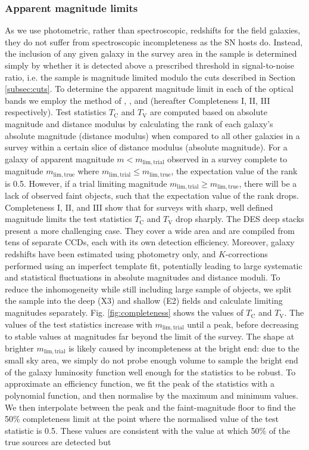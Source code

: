 \documentclass[fleqn,usenatbib]{mnras}
\begin{document}
\subsubsection{Apparent magnitude limits \label{subsubsec:mag_lims}}
As we use photometric, rather than spectroscopic, redshifts for the field galaxies, they do not suffer from spectroscopic incompleteness as the SN hosts do. Instead, the inclusion of any given galaxy in the survey area in the sample is determined simply by whether it is detected above a prescribed threshold in signal-to-noise ratio, i.e. the sample is magnitude limited modulo the cuts described in Section \ref{subsec:cuts}. To determine the apparent magnitude limit in each of the optical bands we employ the method of \citet{Johnston2007}, \citet{Teodoro2010}, and \citet{Johnston2012} (hereafter Completeness I, II, III respectively). Test statistics $T_{\mathrm{C}}$ and $T_{\mathrm{V}}$ are computed based on absolute magnitude and distance modulus by calculating the rank of each galaxy's absolute magnitude (distance modulus) when compared to all other galaxies in a survey within a certain slice of distance modulus (absolute magnitude). For a galaxy of apparent magnitude $m < m_{\mathrm{lim, trial}}$ observed in a survey complete to magnitude $m_{\mathrm{lim, true}}$ where  $m_{\mathrm{lim, trial}} \leq m_{\mathrm{lim, true}}$, the expectation value of the rank is 0.5. However, if a trial limiting magnitude $m_{\mathrm{lim, trial}} \geq m_{\mathrm{lim, true}}$, there will be a lack of observed faint objects, such that the expectation value of the rank drops. Completeness I, II, and III show that for surveys with sharp, well defined magnitude limits the test statistics $T_{\mathrm{C}}$ and $T_{\mathrm{V}}$ drop sharply. The DES deep stacks present a more challenging case. They cover a wide area and are compiled from tens of separate CCDs, each with its own detection efficiency. Moreover, galaxy redshifts have been estimated using photometry only, and $K$-corrections performed using an imperfect template fit, potentially leading to large systematic and statistical fluctuations in absolute magnitudes and distance moduli. To reduce the inhomogeneity while still including  large sample of objects, we split the sample into the deep (X3) and shallow (E2) fields and calculate limiting magnitudes separately. Fig. \ref{fig:completeness} shows the values of $T_{\mathrm{C}}$ and $T_{\mathrm{V}}$. The values of the test statistics increase with $m_{\mathrm{lim, trial}}$ until a peak, before decreasing to stable values at magnitudes far beyond the limit of the survey. The shape at brighter $m_{\mathrm{lim, trial}}$ is likely caused by incompleteness at the bright end: due to the small sky area, we simply do not probe enough volume to sample the bright end of the galaxy luminosity function well enough for the statistics to be robust. To approximate an efficiency function, we fit the peak of the statistics with a polynomial function, and then normalise by the maximum and minimum values. We then interpolate between the peak and the faint-magnitude floor to find the 50\% completeness limit at the point where the normalised value of the test statistic is 0.5. These values are consistent with the value at which 50\% of the true sources are detected but 
\end{document}
